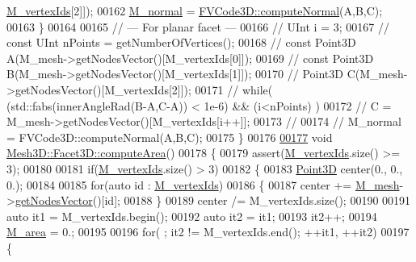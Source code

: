 \begin{DoxyCode}
      \hyperlink{classFVCode3D_1_1Mesh3D_1_1Facet3D_ae763d815d2b4406b2f09d0ee5133392c}{M\_vertexIds}[2]]);
00162         \hyperlink{classFVCode3D_1_1Mesh3D_1_1Facet3D_ada6d0c218b56473802d91a34f2ecc4cf}{M\_normal} = \hyperlink{namespaceFVCode3D_afdf87b62988c2271186926eb3a3baedc}{FVCode3D::computeNormal}(A,B,C);
00163     \}
00164 
00165     \textcolor{comment}{// --- For planar facet ---}
00166 \textcolor{comment}{//  UInt i = 3;}
00167 \textcolor{comment}{//  const UInt nPoints = getNumberOfVertices();}
00168 \textcolor{comment}{//  const Point3D A(M\_mesh->getNodesVector()[M\_vertexIds[0]]);}
00169 \textcolor{comment}{//  const Point3D B(M\_mesh->getNodesVector()[M\_vertexIds[1]]);}
00170 \textcolor{comment}{//  Point3D C(M\_mesh->getNodesVector()[M\_vertexIds[2]]);}
00171 \textcolor{comment}{//  while( (std::fabs(innerAngleRad(B-A,C-A)) < 1e-6) && (i<nPoints) )}
00172 \textcolor{comment}{//      C = M\_mesh->getNodesVector()[M\_vertexIds[i++]];}
00173 \textcolor{comment}{//}
00174 \textcolor{comment}{//  M\_normal = FVCode3D::computeNormal(A,B,C);}
00175 \}
00176 
\hypertarget{Mesh3D_8cpp_source.tex_l00177}{}\hyperlink{classFVCode3D_1_1Mesh3D_1_1Facet3D_add443b097967551ad360f30fc7810f43}{00177} \textcolor{keywordtype}{void} \hyperlink{classFVCode3D_1_1Mesh3D_1_1Facet3D_add443b097967551ad360f30fc7810f43}{Mesh3D::Facet3D::computeArea}()
00178 \{
00179     assert(\hyperlink{classFVCode3D_1_1Mesh3D_1_1Facet3D_ae763d815d2b4406b2f09d0ee5133392c}{M\_vertexIds}.size() >= 3);
00180 
00181     \textcolor{keywordflow}{if}(\hyperlink{classFVCode3D_1_1Mesh3D_1_1Facet3D_ae763d815d2b4406b2f09d0ee5133392c}{M\_vertexIds}.size() > 3)
00182     \{
00183         \hyperlink{classFVCode3D_1_1Point3D}{Point3D} center(0., 0., 0.);
00184 
00185         \textcolor{keywordflow}{for}(\textcolor{keyword}{auto} \textcolor{keywordtype}{id} : \hyperlink{classFVCode3D_1_1Mesh3D_1_1Facet3D_ae763d815d2b4406b2f09d0ee5133392c}{M\_vertexIds})
00186         \{
00187             center += \hyperlink{classFVCode3D_1_1Mesh3D_1_1Facet3D_adf8cf45ade4804389de18428aea4969d}{M\_mesh}->\hyperlink{classFVCode3D_1_1Mesh3D_a04162ec60e0fe52674b3ecbb7de1185c}{getNodesVector}()[id];
00188         \}
00189         center /= M\_vertexIds.size();
00190 
00191         \textcolor{keyword}{auto} it1 = M\_vertexIds.begin();
00192         \textcolor{keyword}{auto} it2 = it1;
00193         it2++;
00194         \hyperlink{classFVCode3D_1_1Mesh3D_1_1Facet3D_a464195f44615c5dcba666c6ec3fde430}{M\_area} = 0.;
00195 
00196         \textcolor{keywordflow}{for}( ; it2 != M\_vertexIds.end(); ++it1, ++it2)
00197         \{

\end{DoxyCode}
